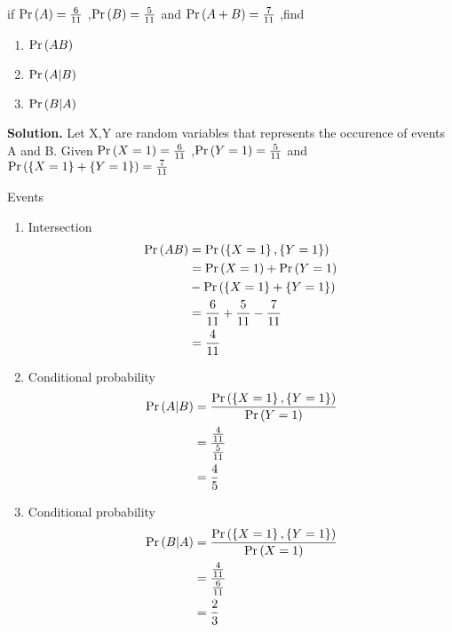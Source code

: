 \documentclass[journal,12pt,twocolumn]{IEEEtran}
\begin{document}
   if $\Pr\left(A\right)=\frac{6}{11}$ ,$\Pr\left(B\right)=\frac{5}{11}$  and $\Pr\left(A+ B\right)=\frac{7}{11}$ ,find
   \begin{enumerate}
   	\item $\Pr\left(AB\right)$
   	\item$\Pr\left(A|B\right)$
   	\item$\Pr\left(B|A\right)$
   \end{enumerate}
\textbf{Solution.}
	Let X,Y are random variables that represents the occurence of events A and B.
Given $\Pr\left(X=1\right)=\frac{6}{11}$ ,$\Pr\left(Y=1\right)=\frac{5}{11}$ and $\Pr\left(\left\{X=1\right\} +\left\{Y=1\right\}\right)=\frac{7}{11}$
	\begin{table}[ht!]
		\centering
		
		\caption{Events}
		\label{table:1}
	\end{table}
\begin{enumerate}
\item Intersection 
\begin{align}
	\Pr\left(AB\right)&=\Pr\left(\left\{X=1\right\},\left\{Y=1\right\}\right)
	\\
     &=\Pr\left(X=1\right)+\Pr\left(Y=1\right)
     \\
     & -\Pr\left(\left\{X=1\right\}+\left\{Y=1\right\}\right)    
     \\
     &=\frac{6}{11}+\frac{5}{11}-\frac{7}{11}
     \\
     &=\frac{4}{11}     
\end{align}
	\item Conditional probability
	\begin{align}
		\Pr\left(A|B\right)&=\frac{\Pr\left(\left\{X=1\right\},\left\{Y=1\right\}\right)}{\Pr\left(Y=1\right)}\\
		        &=\frac{\frac{4}{11}}{\frac{5}{11}}\\
		        &=\frac{4}{5}
	\end{align}
\item Conditional probability
	\begin{align}
	\Pr\left(B|A\right)&=\frac{\Pr\left(\left\{X=1\right\},\left\{Y=1\right\}\right)}{\Pr\left(X=1\right)}\\
	&=\frac{\frac{4}{11}}{\frac{6}{11}}\\
	 &=\frac{2}{3}
   \end{align}
	\end{enumerate}

    
\end{document}

